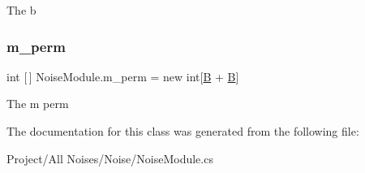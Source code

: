 The b 

\mbox{\label{class_noise_module_a3022dc862ba96b45e5ddcb7bcd2ddc09}} 
\subsubsection{\texorpdfstring{m\+\_\+perm}{m\_perm}}
{\footnotesize\ttfamily int \mbox{[}$\,$\mbox{]} Noise\+Module.\+m\+\_\+perm = new int\mbox{[}\hyperlink{class_noise_module_a2dba0071f6e03f54d2cf67d71d978955}{B} + \hyperlink{class_noise_module_a2dba0071f6e03f54d2cf67d71d978955}{B}\mbox{]}\hspace{0.3cm}{\ttfamily [protected]}}



The m perm 



The documentation for this class was generated from the following file\+:\begin{DoxyCompactItemize}
\item 
Project/\+All Noises/\+Noise/Noise\+Module.\+cs\end{DoxyCompactItemize}

